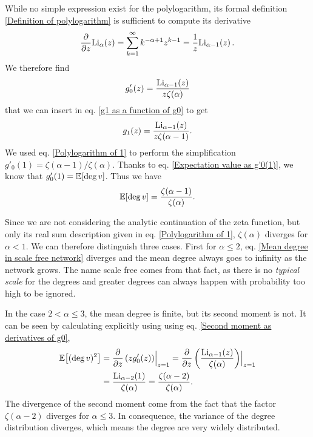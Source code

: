 \documentclass[
11pt, %
english, %
singlespacing, %
nolistspacing, %
liststotoc, %
headsepline, %
]{MastersDoctoralThesis} %
\begin{document}
While no simple expression exist for the polylogarithm, its formal definition \eqref{Definition of polylogarithm} is sufficient to compute its derivative
\begin{align}
	\frac{\partial}{\partial z} \mathrm{Li}_{\alpha}\!\left(z\right) = \sum_{k = 1}^\infty k^{-\alpha + 1} z^{k-1} = \frac{1}{z} \mathrm{Li}_{\alpha - 1}\!\left(z\right). \label{Derivative of the polylogarithm}
\end{align}
We therefore find
\begin{align}
	g'_0(z) = \frac{\mathrm{Li}_{\alpha - 1}\!\left(z\right)}{z \zeta(\alpha)}  \label{Derivative of g0 for scale free networks}
\end{align}
that we can insert in eq. \eqref{g1 as a function of g0} to get
\begin{align}
	g_1(z) =  \frac{\mathrm{Li}_{\alpha - 1}\!\left(z\right)}{z \zeta(\alpha - 1)}.
\end{align}
We used eq. \eqref{Polylogarithm of 1} to perform the simplification $g'_0(1) = \zeta(\alpha - 1)/\zeta(\alpha)$. Thanks to eq. \eqref{Expectation value as g'0(1)}, we know that $g'_0(1) = \mathbb{E}\!\left[ \deg{v} \right]$. Thus we have
\begin{align}
	\mathbb{E}\!\left[ \deg{v} \right] = \frac{\zeta(\alpha - 1)}{\zeta(\alpha)}. \label{Mean degree in scale free network}
\end{align}

Since we are not considering the analytic continuation of the zeta function, but only its real sum description given in eq. \eqref{Polylogarithm of 1}, $\zeta(\alpha)$ diverges for $\alpha < 1$. We can therefore distinguish three cases. First for $\alpha \leq 2$, eq. \eqref{Mean degree in scale free network} diverges and the mean degree always goes to infinity as the network grows. The name scale free comes from that fact, as there is no \emph{typical scale} for the degrees and greater degrees can always happen with probability too high to be ignored.

In the case $2 < \alpha \leq 3$, the mean degree is finite, but its second moment is not. It can be seen by calculating explicitly using using eq. \eqref{Second moment as derivatives of g0},
\begin{align}
	\mathbb{E}\!\left[ (\deg{v})^2 \right] &= \frac{\partial}{\partial z}\left(z g'_0(z)\right)\Bigr|_{z = 1} = \frac{\partial}{\partial z}\left(\frac{\mathrm{Li}_{\alpha - 1}\!\left(z\right)}{\zeta(\alpha)} \right)\Bigr|_{z = 1} \\
		&= \frac{\mathrm{Li}_{\alpha - 2}\!\left(1\right)}{\zeta(\alpha)} = \frac{\zeta(\alpha - 2)}{\zeta(\alpha)}.
\end{align} 
The divergence of the second moment come from the fact that the factor $\zeta(\alpha - 2)$ diverges for $\alpha \leq 3$. In consequence, the variance of the degree distribution diverges, which means the degree are very widely distributed.
\end{document}
